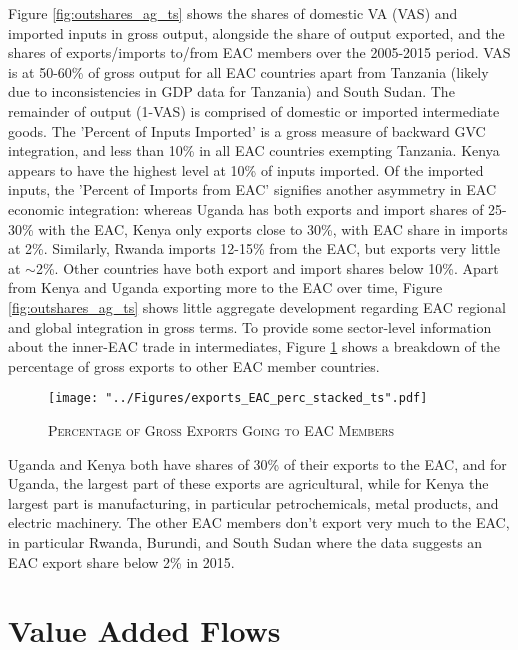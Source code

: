 \documentclass[a4paper]{article}
\begin{document}
Figure \ref{fig:outshares_ag_ts} shows the shares of domestic VA (VAS) and imported inputs in gross output, alongside the share of output exported, and the shares of exports/imports to/from EAC members over the 2005-2015 period. VAS is at 50-60\% of gross output for all EAC countries apart from Tanzania (likely due to inconsistencies in GDP data for Tanzania) and South Sudan. The remainder of output (1-VAS) is comprised of domestic or imported intermediate goods. The 'Percent of Inputs Imported' is a gross measure of backward GVC integration, and less than 10\% in all EAC countries exempting Tanzania. Kenya appears to have the highest level at 10\% of inputs imported. Of the imported inputs, the 'Percent of Imports from EAC' signifies another asymmetry in EAC economic integration: whereas Uganda has both exports and import shares of 25-30\% with the EAC, Kenya only exports close to 30\%, with EAC share in imports at 2\%. Similarly, Rwanda imports 12-15\% from the EAC, but exports very little at $\sim$2\%. Other countries have both export and import shares below 10\%. Apart from Kenya and Uganda exporting more to the EAC over time, Figure \ref{fig:outshares_ag_ts} shows little aggregate development regarding EAC regional and global integration in gross terms. To provide some sector-level information about the inner-EAC trade in intermediates, Figure \ref{fig:exp_EAC_share} shows a breakdown of the percentage of gross exports to other EAC member countries. 

\begin{figure}[h!]
\centering
\caption{\label{fig:exp_EAC_share}\textsc{Percentage of Gross Exports Going to EAC Members}}
\texttt{[image: "../Figures/exports\_EAC\_perc\_stacked\_ts".pdf]} %
\vspace{-1cm}
\end{figure}
\FloatBarrier

Uganda and Kenya both have shares of 30\% of their exports to the EAC, and for Uganda, the largest part of these exports are agricultural, while for Kenya the largest part is manufacturing, in particular petrochemicals, metal products, and electric machinery. The other EAC members don't export very much to the EAC, in particular Rwanda, Burundi, and South Sudan where the data suggests an EAC export share below 2\% in 2015. 


\section{Value Added Flows}
\end{document}
